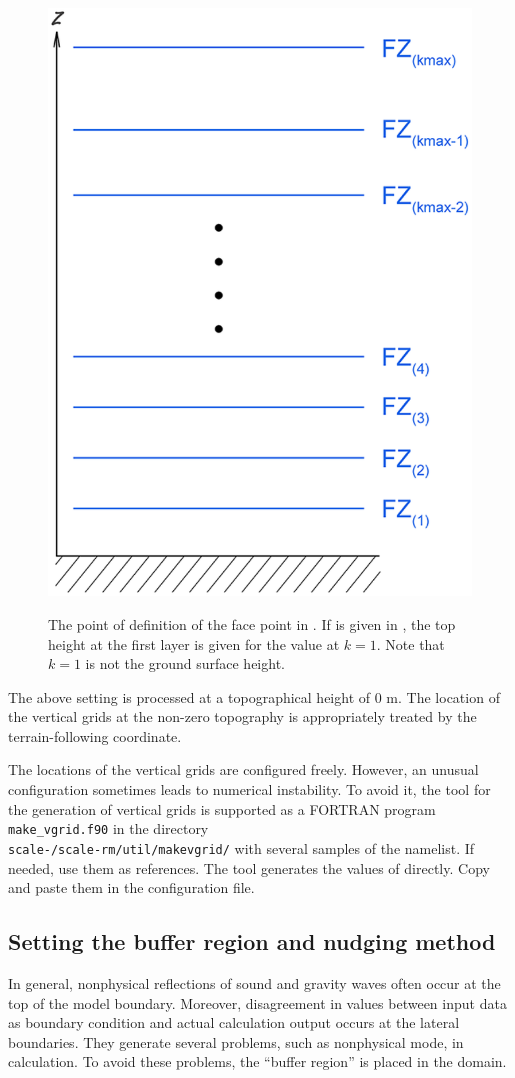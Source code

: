 \begin{figure}[tb]
\begin{center}
  \includegraphics[width=0.4\hsize]{./figure/verticalface.eps}\\
  \caption{The point of definition of the face point in \scalerm. If  is given in , the top height at the first layer is given for the value at $k=1$. Note that $k=1$ is not the ground surface height.}
  \label{fig:scale_grid}
\end{center}
\end{figure}

The above setting is processed at a topographical height of 0 m.
The location of the vertical grids at the non-zero topography is appropriately treated by the terrain-following coordinate.

The locations of the vertical grids are configured freely.
However, an unusual configuration sometimes leads to numerical instability. To avoid it, the tool for the generation of vertical grids is supported as a FORTRAN program \verb|make_vgrid.f90| in the directory\\ \texttt{scale-\version/scale-rm/util/makevgrid/} with several samples of the namelist. If needed, use them as references. The tool generates the values of  directly. Copy and paste them in the configuration file.


\subsection{Setting the buffer region and nudging method} \label{subsec:buffer}

In general,
nonphysical reflections of sound and gravity waves often occur at the top of the model boundary.
Moreover, disagreement in values between input data as boundary condition and actual calculation output occurs at the lateral boundaries. They generate several problems, such as nonphysical mode, in calculation.
To avoid these problems, the ``buffer region'' is placed in the domain.

